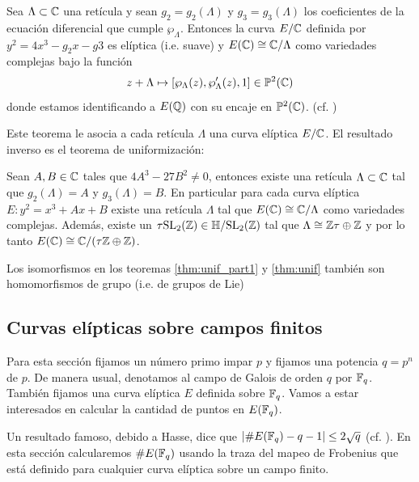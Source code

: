 \documentclass[../../tesis_maestria]{subfiles}
\begin{document}
\begin{thm}\label{thm:unif_part1}
  Sea $\Lambda\subset\mathbb{C}$ una ret\'icula y sean $g_2=g_2(\Lambda)$ y $g_3=g_3(\Lambda)$ los coeficientes
  de la ecuaci\'on diferencial que cumple $\wp_{\Lambda}$. Entonces la curva $E/\mathbb{C}$ definida por
  $y^2=4x^3-g_2x-g3$ es el\'iptica (i.e. suave) y $E(\mathbb{C})\cong\mathbb{C}/\Lambda$ como variedades complejas
  bajo la funci\'on
  \[
    z+\Lambda \mapsto [\wp_{\Lambda}(z),\wp'_{\Lambda}(z),1]\in\mathbb{P}^2(\mathbb{C})
  \]
  donde estamos identificando a $E(\mathbb{Q})$ con su encaje en $\mathbb{P}^2(\mathbb{C})$. (cf.
  \cite[cap\'itulo VI, proposici\'on 3.6]{SilvermanTAOEC})
\end{thm}

Este teorema le asocia a cada ret\'icula $\Lambda$ una curva el\'iptica $E/\mathbb{C}$. El resultado inverso
es el teorema de uniformizaci\'on:

\begin{thm}\label{thm:unif}
  Sean $A,B\in\mathbb{C}$ tales que $4A^3-27B^2\neq0$, entonces existe una ret\'icula $\Lambda\subset\mathbb{C}$ tal
  que $g_2(\Lambda)=A$ y $g_3(\Lambda)=B$. En particular para cada curva el\'iptica $E:y^2=x^3+Ax+B$
  existe una ret\'icula $\Lambda$ tal que $E(\mathbb{C})\cong\mathbb{C}/\Lambda$ como variedades complejas. Además,
  existe un $\tau\mathrm{SL}_2(\mathbb{Z})\in\mathbb{H}/\scriptsize{\mathrm{SL}_2(\mathbb{Z})}$ tal que $\Lambda\cong\mathbb{Z}\tau\oplus\mathbb{Z}$ y
  por lo tanto $E(\mathbb{C})\cong\mathbb{C}/\scriptsize{(\tau\mathbb{Z}\oplus\mathbb{Z})}$.
\end{thm}

Los isomorfismos en los teoremas \ref{thm:unif_part1} y \ref{thm:unif} tambi\'en son homomorfismos
de grupo (i.e. de grupos de Lie)





\subsection{Curvas el\'ipticas sobre campos finitos}%

Para esta secci\'on fijamos un n\'umero primo impar $p$ y fijamos una potencia $q=p^n$ de $p$. De manera
usual, denotamos al campo de Galois de orden $q$ por $\mathbb{F}_q$. Tambi\'en fijamos una curva el\'iptica
$E$ definida sobre $\mathbb{F}_q$. Vamos a estar interesados en calcular la cantidad de puntos en $E(\mathbb{F}_q)$.

Un resultado famoso, debido a Hasse, dice que $\left| \# E(\mathbb{F}_q)-q-1 \right|\leq2\sqrt{q}$ (cf.
\cite[cap\'itulo V, teorema 1.1]{SilvermanTAOEC}). En esta secci\'on calcularemos $\# E(\mathbb{F}_q)$
usando la traza del mapeo de Frobenius que est\'a definido para cualquier curva el\'iptica sobre
un campo finito.
\end{document}
